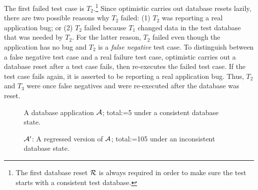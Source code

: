 \documentclass[authoryear,preprint,12pt]{elsarticle}
\begin{document}
The first failed test case is $T_2$.\footnote{The first database reset $\cal{R}$ is always required in order to make sure the test starts with a consistent test database.}  
Since {\sc optimistic} carries out database resets lazily, there are two possible reasons why $T_2$ failed: 
(1) $T_2$ was reporting a real application bug; or (2) $T_2$ failed because $T_1$ changed data in the test database that was needed by $T_2$.  
For the latter reason, $T_2$ failed even though the application has no bug and $T_2$ is a \emph{false negative} test case.  
To distinguish between a false negative test case and a real failure test case, {\sc optimistic} carries out a database reset after a test case fails,
then re-executes the failed test case.  
If the test case fails again, it is asserted to be reporting a real application bug.
Thus, $T_2$ and $T_3$ were once false negatives and were re-executed after the database was reset.



\begin{figure}
\centering
{}
\caption{A database application $\cal{A}$; total:=5 under a consistent database state.}
\label{codeexample1}
\end{figure}

\begin{figure}
\centering
{}
\caption{$\cal{A}'$: A regressed version of $\cal{A}$; total:=105 under an inconsistent database state.}
\label{codeexample2}
\end{figure}
\end{document}
